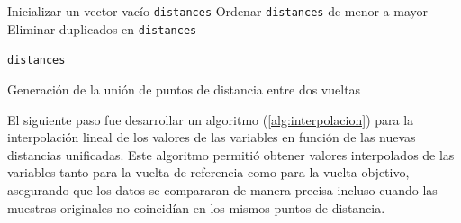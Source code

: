 \IncMargin{1em}
\begin{algorithm}[H]
\LinesNumbered
\SetAlgoLined


\BlankLine
Inicializar un vector vacío \texttt{distances}\;
Ordenar \texttt{distances} de menor a mayor\;
Eliminar duplicados en \texttt{distances}\;

\BlankLine
\Return \texttt{distances}\;

\caption{Generación de la unión de puntos de distancia entre dos vueltas}
\label{alg:union_distancias}
\end{algorithm}
\DecMargin{1em}

El siguiente paso fue desarrollar un algoritmo (\autoref{alg:interpolacion}) para la interpolación lineal de los valores de las variables en función de las nuevas distancias unificadas. Este algoritmo permitió obtener valores interpolados de las variables tanto para la vuelta de referencia como para la vuelta objetivo, asegurando que los datos se compararan de manera precisa incluso cuando las muestras originales no coincidían en los mismos puntos de distancia.


